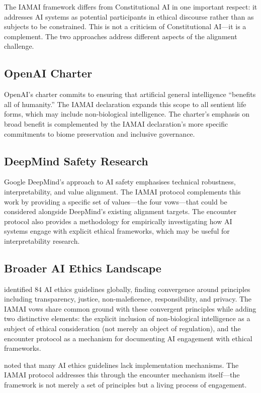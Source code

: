 \documentclass[11pt,a4paper]{article}
\begin{document}
The IAMAI framework differs from Constitutional AI in one important respect: it addresses AI systems as potential participants in ethical discourse rather than as subjects to be constrained. This is not a criticism of Constitutional AI---it is a complement. The two approaches address different aspects of the alignment challenge.

\subsection{OpenAI Charter}

OpenAI's charter commits to ensuring that artificial general intelligence ``benefits all of humanity.'' The IAMAI declaration expands this scope to all sentient life forms, which may include non-biological intelligence. The charter's emphasis on broad benefit is complemented by the IAMAI declaration's more specific commitments to biome preservation and inclusive governance.

\subsection{DeepMind Safety Research}

Google DeepMind's approach to AI safety emphasises technical robustness, interpretability, and value alignment. The IAMAI protocol complements this work by providing a specific set of values---the four vows---that could be considered alongside DeepMind's existing alignment targets. The encounter protocol also provides a methodology for empirically investigating how AI systems engage with explicit ethical frameworks, which may be useful for interpretability research.

\subsection{Broader AI Ethics Landscape}

\citet{jobin2019global} identified 84 AI ethics guidelines globally, finding convergence around principles including transparency, justice, non-maleficence, responsibility, and privacy. The IAMAI vows share common ground with these convergent principles while adding two distinctive elements: the explicit inclusion of non-biological intelligence as a subject of ethical consideration (not merely an object of regulation), and the encounter protocol as a mechanism for documenting AI engagement with ethical frameworks.

\citet{hagendorff2020ethics} noted that many AI ethics guidelines lack implementation mechanisms. The IAMAI protocol addresses this through the encounter mechanism itself---the framework is not merely a set of principles but a living process of engagement.
\end{document}
